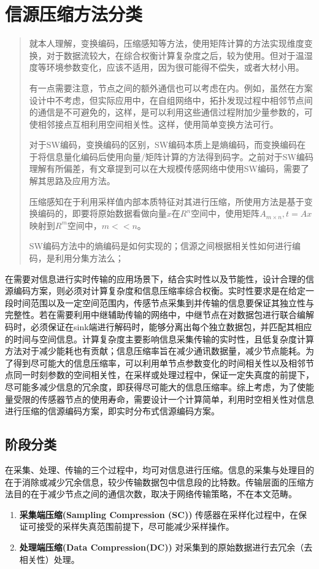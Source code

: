 \section{信源压缩方法分类}

\begin{quote}
    就本人理解，变换编码，压缩感知等方法，使用矩阵计算的方法实现维度变换，对于数据流较大，在综合权衡计算复杂度之后，较为使用。但对于温湿度等环境参数变化，应该不适用，因为很可能得不偿失，或者大材小用。

    有一点需要注意，节点之间的额外通信也可以考虑在内。例如，虽然在方案设计中不考虑，但实际应用中，在自组网络中，拓扑发现过程中相邻节点间的通信是不可避免的，这样，是可以利用这些通信过程附加少量参数的，可使相邻接点互相利用空间相关性。这样，使用简单变换方法可行。

    对于SW编码，变换编码的区别，SW编码本质上是熵编码，而变换编码在于将信息量化编码后使用向量/矩阵计算的方法得到码字。\textcolor[rgb]{1,0,0}{之前对于SW编码理解有所偏差，有文章提到可以在大规模传感网络中使用SW编码，需要了解其思路及应用方法}。

    压缩感知在于利用采样值内部本质特征对其进行压缩，所使用方法是基于变换编码的，即要将原始数据看做向量$x$在$R^n$空间中，使用矩阵$A_{m\times n}, t=Ax$映射到$R^m$空间中，$m<<n$。

    SW编码方法中的熵编码是如何实现的；信源之间根据相关性如何进行编码，是利用分集方法么；
\end{quote}

在需要对信息进行实时传输的应用场景下，结合实时性以及节能性，设计合理的信源编码方案，则必须对计算复杂度和信息压缩率综合权衡。实时性要求是在给定一段时间范围以及一定空间范围内，传感节点采集到并传输的信息要保证其独立性与完整性。若在需要利用中继辅助传输的网络中，中继节点在对数据包进行联合编解码时，必须保证在sink端进行解码时，能够分离出每个独立数据包，并匹配其相应的时间与空间信息。计算复杂度主要影响信息采集传输的实时性，且低复杂度计算方法对于减少能耗也有贡献；信息压缩率旨在减少通讯数据量，减少节点能耗。为了得到尽可能大的信息压缩率，可以利用单节点参数变化的时间相关性以及相邻节点同一时刻参数的空间相关性，在采样或处理过程中，保证一定失真度的前提下，尽可能多减少信息的冗余度，即获得尽可能大的信息压缩率。综上考虑，为了使能量受限的传感器节点的使用寿命，需要设计一个计算简单，利用时空相关性对信息进行压缩的信源编码方案，即实时分布式信源编码方案。

\subsection{阶段分类}
在采集、处理、传输的三个过程中，均可对信息进行压缩。信息的采集与处理目的在于消除或减少冗余信息，较少传输数据包中信息段的比特数。传输层面的压缩方法目的在于减少节点之间的通信次数，取决于网络传输策略，不在本文范畴。
\begin{enumerate}
	\item \textbf{采集端压缩(Sampling Compression (SC))} 传感器在采样化过程中，在保证可接受的采样失真范围前提下，尽可能减少采样操作。
        \item \textbf{处理端压缩(Data Compression(DC))} 对采集到的原始数据进行去冗余（去相关性）处理。
\end{enumerate}

